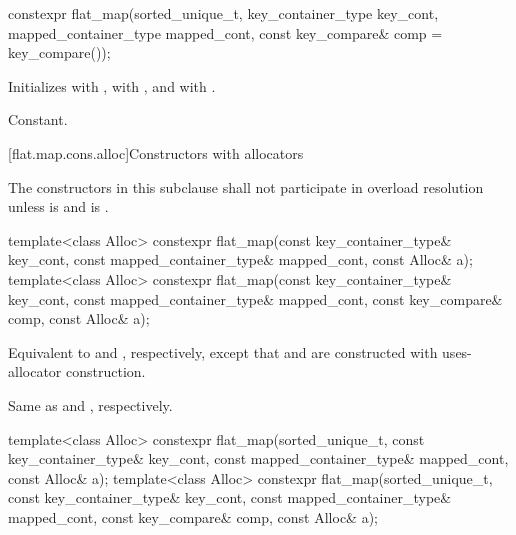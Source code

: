 %
\begin{itemdecl}
constexpr flat_map(sorted_unique_t, key_container_type key_cont, mapped_container_type mapped_cont,
                   const key_compare& comp = key_compare());
\end{itemdecl}

\begin{itemdescr}
\pnum
\effects
Initializes
 with ,
 with , and
 with .

\pnum
\complexity
Constant.
\end{itemdescr}

[flat.map.cons.alloc]{Constructors with allocators}

\pnum
The constructors in this subclause shall not participate in overload resolution
unless  is 
and  is .

%
\begin{itemdecl}
template<class Alloc>
  constexpr flat_map(const key_container_type& key_cont, const mapped_container_type& mapped_cont,
                     const Alloc& a);
template<class Alloc>
  constexpr flat_map(const key_container_type& key_cont, const mapped_container_type& mapped_cont,
                     const key_compare& comp, const Alloc& a);
\end{itemdecl}

\begin{itemdescr}
\pnum
\effects
Equivalent to  and
, respectively,
except that  and  are constructed with
uses-allocator construction.

\pnum
\complexity
Same as  and
, respectively.
\end{itemdescr}

%
\begin{itemdecl}
template<class Alloc>
  constexpr flat_map(sorted_unique_t, const key_container_type& key_cont,
                     const mapped_container_type& mapped_cont, const Alloc& a);
template<class Alloc>
  constexpr flat_map(sorted_unique_t, const key_container_type& key_cont,
                     const mapped_container_type& mapped_cont, const key_compare& comp,
                     const Alloc& a);
\end{itemdecl}

